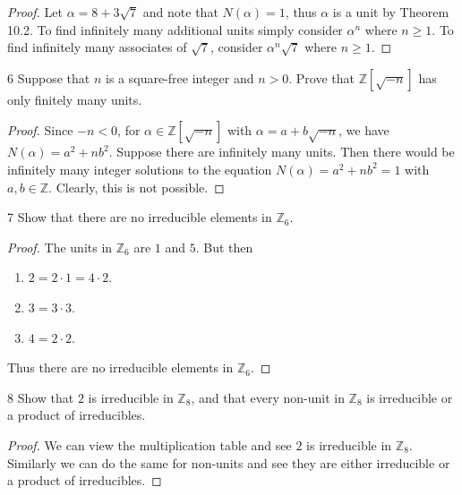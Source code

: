 \begin{proof}
    Let $\alpha = 8 + 3\sqrt{7}$ and note that $N(\alpha) = 1$,
        thus $\alpha$ is a unit by Theorem 10.2.
    To find infinitely many additional units simply consider $\alpha^n$
        where $n \ge 1$.
    To find infinitely many associates of $\sqrt{7}$,
        consider $\alpha^n \sqrt{7}$ where $n \ge 1$.
\end{proof}

\begin{problem}{6}
    Suppose that $n$ is a square-free integer and $n > 0$.
    Prove that $\mathbb{Z}[\sqrt{-n}]$ has only finitely many units.
\end{problem}
\solved

\begin{proof}
    Since $-n < 0$, for $\alpha \in \mathbb{Z}[\sqrt{-n}]$ with $\alpha = a + b\sqrt{-n}$, we have
        $N(\alpha) = a^2 + n b^2$.
    Suppose there are infinitely many units.
    Then there would be infinitely many integer solutions 
        to the equation $N(\alpha) = a^2 + n b^2 = 1$ with $a, b \in \mathbb{Z}$.
    Clearly, this is not possible.
\end{proof}

\begin{problem}{7}
    Show that there are no irreducible elements in $\mathbb{Z}_6$.
\end{problem}
\solved

\begin{proof}
    The units in $\mathbb{Z}_6$ are $1$ and $5$.
    But then 
    \begin{enumerate}
        \item $2 = 2 \cdot 1 = 4 \cdot 2$.
        \item $3 = 3 \cdot 3$.
        \item $4 = 2 \cdot 2$.
    \end{enumerate}
    Thus there are no irreducible elements in $\mathbb{Z}_6$.
\end{proof}

\begin{problem}{8}
    Show that $2$ is irreducible in $\mathbb{Z}_8$, and that 
    every non-unit in $\mathbb{Z}_8$ is irreducible or a product of irreducibles.
\end{problem}
\solved

\begin{proof}
    We can view the multiplication table and see $2$ is irreducible in $\mathbb{Z}_8$.
    Similarly we can do the same for non-units and see they are either irreducible or a product of irreducibles.
\end{proof}

